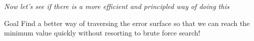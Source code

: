 \begin{frame}
\end{frame}

\begin{frame}
	\fontsize{16pt}{7.2}\selectfont
	\textit{Now let's see if there is a more efficient and principled way of doing this}
\end{frame}

\begin{frame}
	\begin{block}{Goal}
		Find a better way of traversing the error surface so that we can reach the minimum value quickly without resorting to brute force search! 
	\end{block}
\end{frame}


\begin{frame}
	\begin{overlayarea}{\textwidth}{\textheight}
		
	\end{overlayarea}
	
\end{frame}

